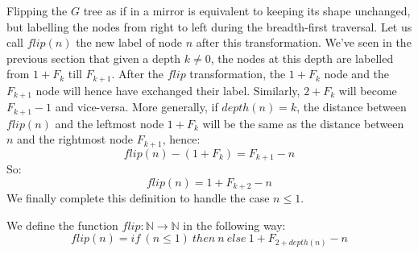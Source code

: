 \documentclass[a4paper,11pt]{article}
\begin{document}
Flipping the $G$ tree as if in a mirror is equivalent to keeping
its shape unchanged, but labelling the nodes from right to left
during the breadth-first traversal. Let us call $flip(n)$ the
new label of node $n$ after this transformation.
We've seen in the previous section that given a depth $k\neq 0$,
the nodes at this depth are labelled from $1+F_k$ till $F_{k+1}$.
After the $flip$ transformation, the $1+F_k$ node and
the $F_{k+1}$ node will hence have exchanged their label.
Similarly, $2+F_k$ will become $F_{k+1}-1$ and vice-versa.
More generally, if $depth(n)=k$, the distance between
$flip(n)$ and the leftmost node $1+F_{k}$ will be the same
as the distance between $n$ and the rightmost node $F_{k+1}$,
hence:
$$flip(n) - (1+F_{k}) = F_{k+1} - n$$
So:
$$flip(n) = 1+F_{k+2}-n$$
We finally complete this definition to handle the case $n\le 1$.
\begin{definition}
We define the function $flip : \mathbb{N}\to\mathbb{N}$
in the following way:
$$flip(n) = if~(n\le 1)~then~n~else~1+F_{2+depth(n)}-n$$
\end{definition}
\end{document}
